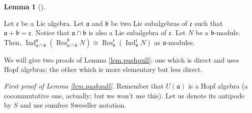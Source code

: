 \documentclass
[numbers=enddot,12pt,final,onecolumn,german,notitlepage]{scrartcl}%
\theoremstyle{definition}
\newtheorem{lem}[theo]{Lemma}
\newenvironment{lemma}[1][]
{\begin{lem}[#1]\begin{leftbar}}
{\end{leftbar}\end{lem}}
\begin{document}
\begin{lemma}
\label{lem.IndRes}Let $\mathfrak{c}$ be a Lie algebra. Let $\mathfrak{a}$ and
$\mathfrak{b}$ be two Lie subalgebras of $\mathfrak{c}$ such that
$\mathfrak{a}+\mathfrak{b}=\mathfrak{c}$. Notice that $\mathfrak{a}%
\cap\mathfrak{b}$ is also a Lie subalgebra of $\mathfrak{c}$. Let $N$ be a
$\mathfrak{b}$-module. Then, $\operatorname*{Ind}\nolimits_{\mathfrak{a}%
\cap\mathfrak{b}}^{\mathfrak{a}}\left(  \operatorname*{Res}%
\nolimits_{\mathfrak{a}\cap\mathfrak{b}}^{\mathfrak{b}}N\right)
\cong\operatorname*{Res}\nolimits_{\mathfrak{a}}^{\mathfrak{c}}\left(
\operatorname*{Ind}\nolimits_{\mathfrak{b}}^{\mathfrak{c}}N\right)  $ as
$\mathfrak{a}$-modules.
\end{lemma}

We will give two proofs of Lemma \ref{lem.pushpull}: one which is direct and
uses Hopf algebras; the other which is more elementary but less direct.

\textit{First proof of Lemma \ref{lem.pushpull}.} Remember that $U\left(
\mathfrak{a}\right)  $ is a Hopf algebra (a cocommutative one, actually; but
we won't use this). Let us denote its antipode by $S$ and use sumfree Sweedler notation.
\end{document}
